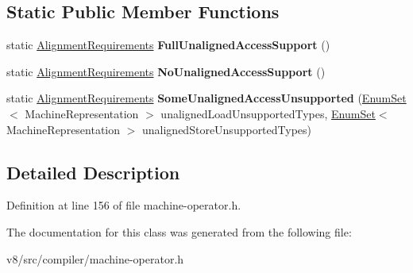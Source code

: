 \subsection*{Static Public Member Functions}
\begin{DoxyCompactItemize}
\item 
\mbox{\label{classv8_1_1internal_1_1compiler_1_1MachineOperatorBuilder_1_1AlignmentRequirements_acf18a2cbc43588893a074af63709356e}} 
static \mbox{\hyperlink{classv8_1_1internal_1_1compiler_1_1MachineOperatorBuilder_1_1AlignmentRequirements}{Alignment\+Requirements}} {\bfseries Full\+Unaligned\+Access\+Support} ()
\item 
\mbox{\label{classv8_1_1internal_1_1compiler_1_1MachineOperatorBuilder_1_1AlignmentRequirements_a32ad658c0dde33f8d0d4cbb551112f7c}} 
static \mbox{\hyperlink{classv8_1_1internal_1_1compiler_1_1MachineOperatorBuilder_1_1AlignmentRequirements}{Alignment\+Requirements}} {\bfseries No\+Unaligned\+Access\+Support} ()
\item 
\mbox{\label{classv8_1_1internal_1_1compiler_1_1MachineOperatorBuilder_1_1AlignmentRequirements_a3ac450768bf99b4c835354b691433d7c}} 
static \mbox{\hyperlink{classv8_1_1internal_1_1compiler_1_1MachineOperatorBuilder_1_1AlignmentRequirements}{Alignment\+Requirements}} {\bfseries Some\+Unaligned\+Access\+Unsupported} (\mbox{\hyperlink{classv8_1_1internal_1_1EnumSet}{Enum\+Set}}$<$ Machine\+Representation $>$ unaligned\+Load\+Unsupported\+Types, \mbox{\hyperlink{classv8_1_1internal_1_1EnumSet}{Enum\+Set}}$<$ Machine\+Representation $>$ unaligned\+Store\+Unsupported\+Types)
\end{DoxyCompactItemize}


\subsection{Detailed Description}


Definition at line 156 of file machine-\/operator.\+h.



The documentation for this class was generated from the following file\+:\begin{DoxyCompactItemize}
\item 
v8/src/compiler/machine-\/operator.\+h\end{DoxyCompactItemize}
